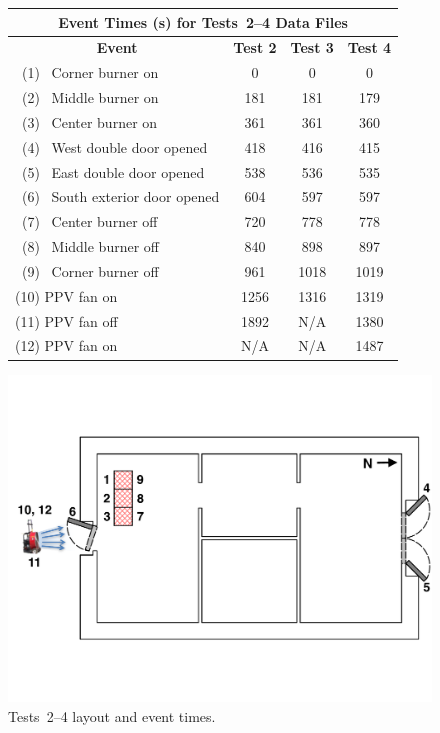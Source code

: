 \documentclass[12pt,oneside]{book}
\begin{document}
\begin{figure}[!ht]
\begin{minipage}[b]{0.8\columnwidth}
	\begin{flushleft}
	\begin{tabular}{lccc}
	\multicolumn{4}{c}{\normalsize Event Times (s) for Tests~2--4 Data Files} \\
	\toprule
	\multicolumn{1}{c}{\textbf{Event}} 	& \textbf{Test 2} & \textbf{Test 3} & \textbf{Test 4} \\
	\midrule
	~(1)~ Corner burner on 				& 	0		  	  &	 	0			&		0		  \\
	~(2)~ Middle burner on 				&   181			  &		181			&		179		  \\
	~(3)~ Center burner on 				&   361			  &	   	361			&	   	360		  \\
	~(4)~ West double door opened 		&   418			  &    	416			&	   	415		  \\
	~(5)~ East double door opened 		&   538			  &    	536			&	   	535		  \\
	~(6)~ South exterior door opened 	&   604			  &    	597			&	   	597		  \\
	~(7)~ Center burner off				&   720			  &    	778			&	   	778		  \\
	~(8)~ Middle burner off				&   840			  &    	898			&	   	897		  \\
	~(9)~ Corner burner off				&   961			  &    	1018		&	   	1019	  \\
	(10) PPV fan on 					& 	1256		  &    	1316		&  	   	1319	  \\
	(11) PPV fan off 					& 	1892 		  & 	N/A 		& 		1380	  \\
	(12) PPV fan on 					& 	N/A 		  & 	N/A 		& 		1487 	  \\
	\bottomrule
	\end{tabular}
	\end{flushleft}
\end{minipage}
\begin{minipage}[b]{0.9\columnwidth}
	\vspace{15pt}
	\centering
	\includegraphics[width=\columnwidth]{../Figures/Floor_Plans/East_Structure_Test_4}
\end{minipage}
\caption{Tests~2--4 layout and event times.}
\label{fig:Tests_2-4_layout}
\end{figure}
\end{document}
